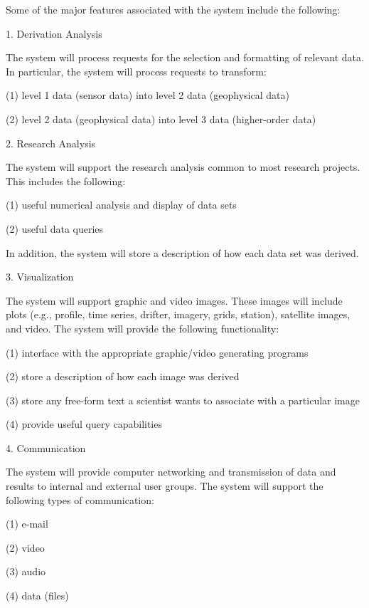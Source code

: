 	Some of the major features associated with the system include the 
following:
\begin{description}
\item{1.} Derivation Analysis

\noindent The system will process requests for the selection and formatting 
of relevant data.  In particular, the system will process requests to 
transform:
\begin{description}
	\item{(1)}	level 1 data (sensor data) into level 2 data
(geophysical data) 
	\item{(2)}	level 2 data (geophysical data) into level 3 data
(higher-order data)
\end{description}

\item{2.} Research Analysis

\noindent The system will support the research analysis common to most 
research projects.  This includes the following:
\begin{description}
	\item{(1)}	useful numerical analysis and display of data sets
	\item{(2)}	useful data queries 
\end{description}

\noindent In addition, the system will store a description of how each data
set was derived.

\item{3.}	Visualization

\noindent The system will support graphic and video images.  These images 
will include plots (e.g., profile, time series, drifter, imagery, grids, 
station), satellite images, and video.  The system will provide the 
following functionality:
\begin{description}
	\item{(1)}	interface with the appropriate graphic/video generating 
programs
	\item{(2)}	store a description of how each image was derived
	\item{(3)}	store any free-form text a scientist wants to
associate with a particular image
	\item{(4)}	provide useful query capabilities
\end{description}

\item{4.}	Communication

\noindent The system will provide computer networking and transmission of 
data and results to internal and external user groups.  The system will 
support the following types of communication:
\begin{description}
	\item{(1)}	e-mail
	\item{(2)}	video
	\item{(3)}	audio
	\item{(4)}	data (files)
\end{description}


\end{description}
